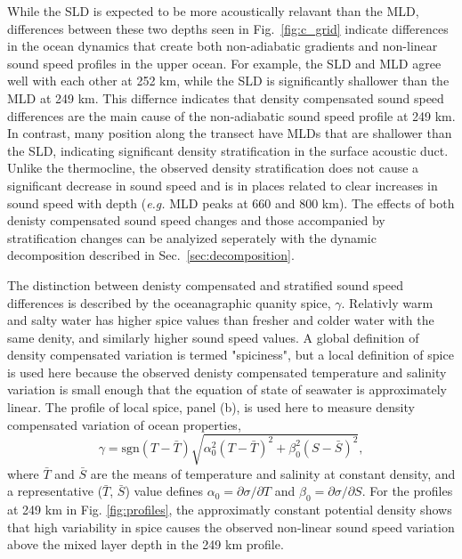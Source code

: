 \documentclass[preprint,NumberedRefs]{JASA}
\begin{document}
While the SLD is expected to be more acoustically relavant than the MLD, differences between these two depths seen in Fig.~\ref{fig:c_grid} indicate differences in the ocean dynamics that create both non-adiabatic gradients and non-linear sound speed profiles in the upper ocean. For example, the SLD and MLD agree well with each other at 252 km, while the SLD is significantly shallower than the MLD at 249 km. This differnce indicates that density compensated sound speed differences are the main cause of the non-adiabatic sound speed profile at 249 km. In contrast, many position along the transect have MLDs that are shallower than the SLD, indicating significant density stratification in the surface acoustic duct. Unlike the thermocline, the observed density stratification does not cause a significant decrease in sound speed and is in places related to clear increases in sound speed with depth (\emph{e.g.} MLD peaks at 660 and 800 km). The effects of both denisty compensated sound speed changes and those accompanied by stratification changes can be analyized seperately with the dynamic decomposition described in Sec.~\ref{sec:decomposition}.

The distinction between denisty compensated and stratified sound speed differences is described by the oceanagraphic quanity spice, $\gamma$. Relativly warm and salty water has higher spice values than fresher and colder water with the same denity, and similarly higher sound speed values. A global definition of density compensated variation is termed "spiciness"\citep{mcdougall2015spiciness}, but a local definition of spice is used here because the observed denisty compensated temperature and salinity variation is small enough that the equation of state of seawater is approximately linear\citep{ferrari2000}. The profile of local spice, panel (b), is used here to measure density compensated variation \citep{klymak2015spice} of ocean properties,
\begin{equation}
    \gamma=\textrm{sgn}(T-\bar{T}) \sqrt{\alpha_0^2(T-\bar{T})^2 +\beta_0^2(S-\bar{S})^2},
    \label{eq:gamma}
\end{equation}
where $\bar{T}$ and $\bar{S}$ are the means of temperature and salinity at constant density, and a representative ($\bar{T}$, $\bar{S}$) value defines $\alpha_0=\partial \sigma / \partial T$ and $\beta_0=\partial \sigma / \partial S$. For the profiles at 249 km in Fig. \ref{fig:profiles}, the approximatly constant potential density shows that high variability in spice causes the observed non-linear sound speed variation above the mixed layer depth  in the 249 km profile.
\end{document}
